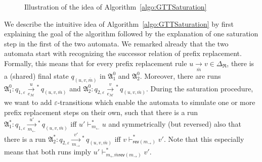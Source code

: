 \documentclass{LMCS}
\newcommand{\apathS}[2][]{\xrightarrow[#1]{#2}\!\!{}^*\,}
\newcommand{\eps}{\varepsilon}
\newcommand{\DeltaR}{\Delta_{\mathfrak R}}
\newcommand{\automatonA}{\mathfrak A}
\newcommand{\configstepsCost}[2][*]{\vdash^{#1}_{#2}}
\newcommand{\pdsrule}[3]{#1 \xrightarrow[#2]{} #3}
\newcommand{\rl}{m_{\leftarrow}}
\newcommand{\rr}{m_{\rightarrow}}
\newcommand{\rev}{\mathsf{rev}}
\newcommand{\annotationMonoidM}{\mathcal M}
\newcommand{\neutralM}[1][]{e_{\annotationMonoidM_{#1}}}
\begin{document}
\begin{figure}[t]
\begin{center}
 	\end{center}
	\caption{Illustration of the idea of Algorithm~\ref{algo:GTTSaturation}}
	\label{fig:SaturationIdea}
\end{figure}


We describe the intuitive idea of Algorithm~\ref{algo:GTTSaturation} by first
explaining the goal of the algorithm followed by the explanation of one
saturation step in the first of the two automata. We remarked already that the
two automata start with recognizing the successor relation of prefix
replacement. Formally, this means that for every prefix replacement rule
$\pdsrule{u}{\bar m}{v} \in \DeltaR$, there is a (shared) final state
$q_{(u,v,\bar m)}$ in $\automatonA^0_1$ and $\automatonA^0_2$. Moreover, there
are runs $\automatonA^0_1: q_{1,\eps} \apathS[\neutralM]{u} q_{(u,v,\bar m)}$
and $\automatonA^0_2: q_{2,\eps} \apathS[\neutralM]{v} q_{(u,v,\bar m)}$. During
the saturation procedure, we want to add $\eps$-transitions which enable the
automata to simulate one or more prefix replacement steps on their own, such
that there is a run $\automatonA^*_1: q_{1,\eps} \apathS[\rl]{u'} q_{(u,v,\bar
m)}$ iff $u' \configstepsCost{\rl} u$ and symmetrically (but reversed) also that there is a run
$\automatonA^*_2: q_{2,\eps} \apathS[\rr]{v'} q_{(u,v,\bar m)}$ iff $v
\configstepsCost{\rev(\rr)} v'$. Note that this especially means that both runs
imply $u' \configstepsCost{\rl \bar m \rev(\rr)} v'$. 
\end{document}
